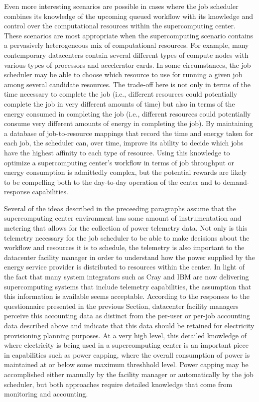 Even more interesting scenarios are possible in cases where the job
scheduler combines its knowledge of the upcoming queued workflow with
its knowledge and control over the computational resources within
the supercomputing center.  These scenarios are most appropriate when
the supercomputing scenario contains a pervasively heterogeneous mix
of computational resources.  For example, many contemporary datacenters
contain several different types of compute nodes with various types of
processors and accelerator cards.  In some circumstances, the job
scheduler may be able to choose which resource to use for running a
given job among several candidate resources.  The trade-off here is
not only in terms of the time necessary to complete the job (i.e.,
different resources could potentially complete the job in very different
amounts of time) but also in terms of the energy consumed in completing
the job (i.e., different resources could potentially consume very
different amounts of energy in completing the job).  By maintaining a
database of job-to-resource mappings that record the time and energy
taken for each job, the scheduler can, over time, improve its ability
to decide which jobs have the highest affinity to each type of resource.
Using this knowledge to optimize a supercomputing center's workflow in
terms of job throughput or energy consumption is admittedly complex,
but the potential rewards are likely to be compelling both to the
day-to-day operation of the center and to demand-response capabilities.

Several of the ideas described in the preceeding paragraphs assume
that the supercomputing center environment has some amount of
instrumentation and metering that allows for the collection of power
telemetry data.  Not only is this telemetry necessary for the job
scheduler to be able to make decisions about the workflow and
resources it is to schedule, the telemetry is also important to the
datacenter facility manager in order to understand how the power
supplied by the energy service provider is distributed to resources
within the center.  In light of the fact that many system integrators
such as Cray and IBM are now delivering supercomputing systems that
include telemetry capabilities, the assumption that this information
is available seems acceptable.  According to the responses to the
questionnaire presented in the previous Section, datacenter facility
managers perceive this accounting data as distinct from the per-user
or per-job accounting data described above and indicate that this
data should be retained for electricity provisioning planning purposes.
At a very high level, this detailed knowledge of where electricity is
being used in a supercomputing center is an important piece in
capabilities such as power capping, where the overall consumption of
power is maintained at or below some maximum threshhold level.  Power
capping may be accomplished either manually by the facility manager
or automatically by the job scheduler, but both approaches require
detailed knowledge that come from monitoring and accounting.

